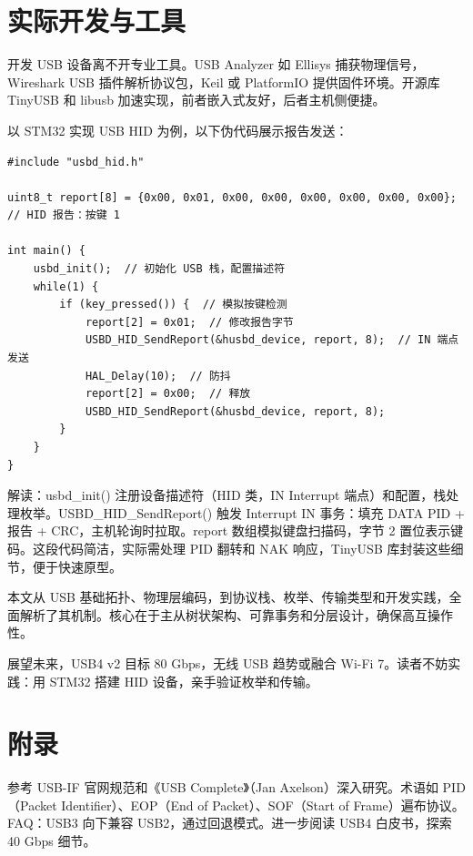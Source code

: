 \chapter{实际开发与工具}
开发 USB 设备离不开专业工具。USB Analyzer 如 Ellisys 捕获物理信号，Wireshark USB 插件解析协议包，Keil 或 PlatformIO 提供固件环境。开源库 TinyUSB 和 libusb 加速实现，前者嵌入式友好，后者主机侧便捷。\par
以 STM32 实现 USB HID 为例，以下伪代码展示报告发送：\par
\begin{lstlisting}
#include "usbd_hid.h"

uint8_t report[8] = {0x00, 0x01, 0x00, 0x00, 0x00, 0x00, 0x00, 0x00};  // HID 报告：按键 1

int main() {
    usbd_init();  // 初始化 USB 栈，配置描述符
    while(1) {
        if (key_pressed()) {  // 模拟按键检测
            report[2] = 0x01;  // 修改报告字节
            USBD_HID_SendReport(&husbd_device, report, 8);  // IN 端点发送
            HAL_Delay(10);  // 防抖
            report[2] = 0x00;  // 释放
            USBD_HID_SendReport(&husbd_device, report, 8);
        }
    }
}
\end{lstlisting}
解读：usbd\_{}init() 注册设备描述符（HID 类，IN Interrupt 端点）和配置，栈处理枚举。USBD\_{}HID\_{}SendReport() 触发 Interrupt IN 事务：填充 DATA PID + 报告 + CRC，主机轮询时拉取。report 数组模拟键盘扫描码，字节 2 置位表示键码。这段代码简洁，实际需处理 PID 翻转和 NAK 响应，TinyUSB 库封装这些细节，便于快速原型。\par
本文从 USB 基础拓扑、物理层编码，到协议栈、枚举、传输类型和开发实践，全面解析了其机制。核心在于主从树状架构、可靠事务和分层设计，确保高互操作性。\par
展望未来，USB4 v2 目标 80 Gbps，无线 USB 趋势或融合 Wi-Fi 7。读者不妨实践：用 STM32 搭建 HID 设备，亲手验证枚举和传输。\par
\chapter{附录}
参考 USB-IF 官网规范和《USB Complete》（Jan Axelson）深入研究。术语如 PID（Packet Identifier）、EOP（End of Packet）、SOF（Start of Frame）遍布协议。FAQ：USB3 向下兼容 USB2，通过回退模式。进一步阅读 USB4 白皮书，探索 40 Gbps 细节。\par
